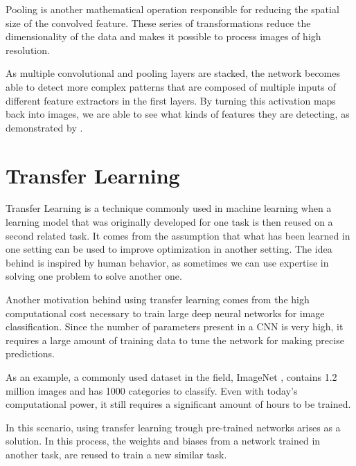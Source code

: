 Pooling is another mathematical operation responsible for reducing the spatial size of the convolved feature. These series of transformations reduce the dimensionality of the data and makes it possible to process images of high resolution. 

As multiple convolutional and pooling layers are stacked, the network becomes able to detect more complex patterns that are composed of multiple inputs of different feature extractors in the first layers. By turning this activation maps back into images, we are able to see what kinds of features they are detecting, as demonstrated by \citep{ZeilerF14}.



\section{Transfer Learning}

Transfer Learning is a technique commonly used in machine learning when a learning model that was originally developed for one task is then reused on a second related task. It comes from the assumption that what has been learned in one setting can be used to improve optimization in another setting. The idea behind is inspired by human behavior, as sometimes we can use expertise in solving one problem to solve another one.

Another motivation behind using transfer learning comes from the high computational cost necessary to train large deep neural networks for image classification. Since the number of parameters present in a CNN is very high, it requires a large amount of training data to tune the network for making precise predictions.

As an example, a commonly used dataset in the field, ImageNet \citep{DengDSLL009}, contains 1.2 million images and has 1000 categories to classify. Even with today's computational power, it still requires a significant amount of hours to be trained.

In this scenario, using transfer learning trough pre-trained networks arises as a solution. In this process, the weights and biases from a network trained in another task, are reused to train a new similar task.

